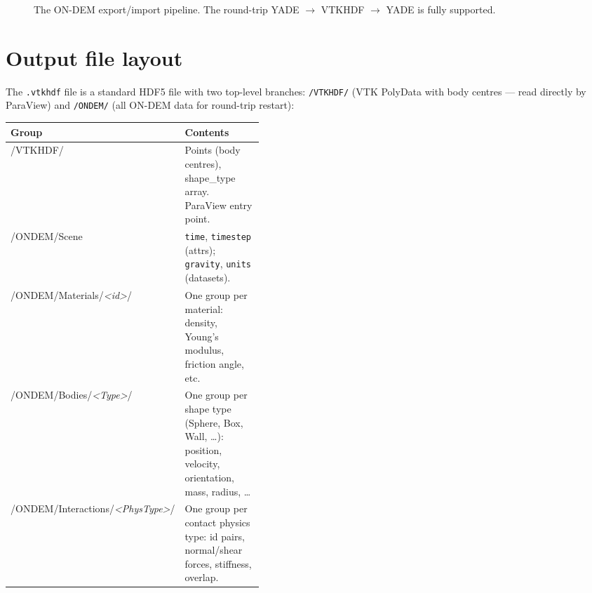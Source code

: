 \documentclass[10pt,a4paper]{article}
\begin{document}
\begin{figure}[h!]
{}
\caption{The ON-DEM export/import pipeline. The round-trip YADE $\to$ VTKHDF $\to$ YADE is fully supported.}
\end{figure}

\section{Output file layout}

The \texttt{.vtkhdf} file is a standard HDF5 file with two top-level branches:
\texttt{/VTKHDF/} (VTK PolyData with body centres — read directly by ParaView)
and \texttt{/ONDEM/} (all ON-DEM data for round-trip restart):

\smallskip
\begin{tabularx}{\textwidth}{>{\ttfamily\small}p{0.42\linewidth}>{\small\raggedright\arraybackslash}X}
\toprule
\sffamily\textbf{Group} & \sffamily\textbf{Contents} \\
\midrule
/VTKHDF/                        & Points (body centres), shape\_type array. ParaView entry point. \\
/ONDEM/Scene                    & \texttt{time}, \texttt{timestep} (attrs); \texttt{gravity}, \texttt{units} (datasets). \\
/ONDEM/Materials/\textit{<id>}/ & One group per material: density, Young's modulus, friction angle, etc. \\
/ONDEM/Bodies/\textit{<Type>}/  & One group per shape type (Sphere, Box, Wall, \ldots): position, velocity, orientation, mass, radius, \ldots \\
/ONDEM/Interactions/\textit{<PhysType>}/ & One group per contact physics type: id pairs, normal/shear forces, stiffness, overlap. \\
\bottomrule
\end{tabularx}
\end{document}
